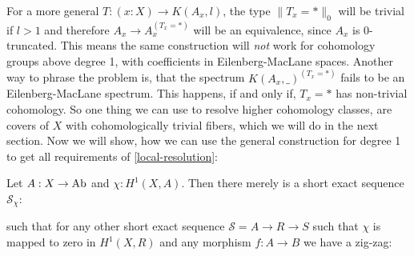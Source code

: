 For a more general $T:(x:X)\to K(A_x,l)$,
the type $\|T_x=\ast\|_0$ will be trivial if $l>1$ and therefore $A_x\to A_x^{(T_x=\ast)}$ will be an equivalence,
since $A_x$ is 0-truncated.
This means the same construction will \emph{not} work for cohomology groups above degree 1,
with coefficients in Eilenberg-MacLane spaces.
Another way to phrase the problem is,
that the spectrum $K(A_x,\_)^{(T_x=\ast)}$ fails to be an Eilenberg-MacLane spectrum.
This happens, if and only if, ${T_x=\ast}$ has non-trivial cohomology.
So one thing we can use to resolve higher cohomology classes, are covers of $X$ with cohomologically trivial fibers,
which we will do in the next section.
Now we will show, how we can use the general construction for degree 1 to get all requirements of \cref{local-resolution}:

\begin{lemma}
  \label{general-1-resolution-exists}
  Let $A:X\to\operatorname{Ab}$ and $\chi:H^1(X,A)$.
  Then there merely is a short exact sequence $\mathcal{S}_\chi$:
  \begin{center}
  \end{center}
  such that for any other short exact sequence $\mathcal{S}=A\to R\to S$
  such that $\chi$ is mapped to zero in $H^1(X,R)$ and any morphism $f:A\to B$ we have
  a zig-zag:
  \begin{center}
  \end{center}
\end{lemma}

